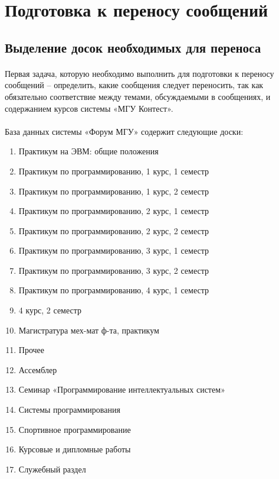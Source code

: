 \documentclass[12pt, a4paper, oneside]{article}
\begin{document}
    \section{Подготовка к переносу сообщений}
        \subsection{Выделение досок необходимых для переноса}
            \paragraph{}
            Первая задача, которую необходимо выполнить для подготовки к переносу сообщений – определить, какие сообщения следует переносить, так как обязательно соответствие между темами, обсуждаемыми в сообщениях, и содержанием курсов системы «МГУ Контест».
            \paragraph{}
            База данных системы «Форум МГУ» содержит следующие доски:
            \begin{enumerate}
                \item Практикум на ЭВМ: общие положения
                \item Практикум по программированию, 1 курс, 1 семестр
                \item Практикум по программированию, 1 курс, 2 семестр
                \item Практикум по программированию, 2 курс, 1 семестр
                \item Практикум по программированию, 2 курс, 2 семестр
                \item Практикум по программированию, 3 курс, 1 семестр
                \item Практикум по программированию, 3 курс, 2 семестр
                \item Практикум по программированию, 4 курс, 1 семестр
                \item 4 курс, 2 семестр
                \item Магистратура мех-мат ф-та, практикум
                \item Прочее
                \item Ассемблер
                \item Семинар «Программирование интеллектуальных систем»
                \item Системы программирования
                \item Спортивное программирование
                \item Курсовые и дипломные работы
                \item Служебный раздел
            \end{enumerate}
\end{document}
